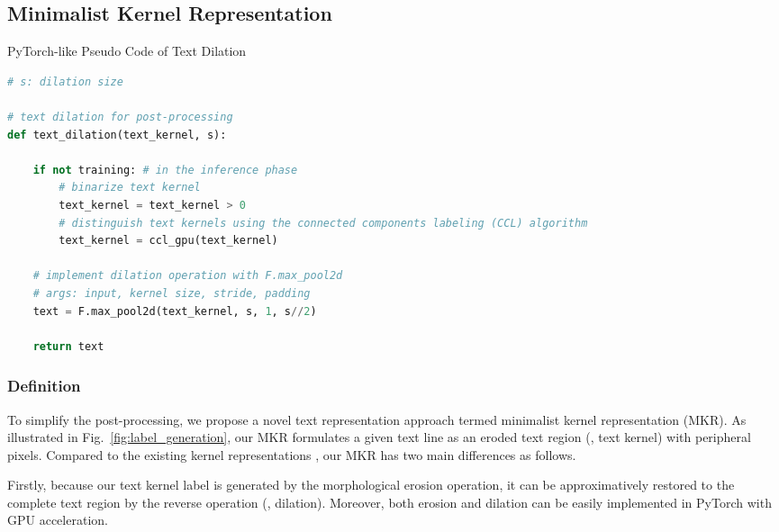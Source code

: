 \documentclass[lettersize,journal]{IEEEtran}
\begin{document}
\subsection{Minimalist Kernel Representation}



\begin{algorithm}[!t]

\caption{PyTorch-like Pseudo Code of Text Dilation}
\label{alg:pseudo_code}

\begin{lstlisting}[language=python]
# s: dilation size

# text dilation for post-processing
def text_dilation(text_kernel, s):

    if not training: # in the inference phase
        # binarize text kernel
        text_kernel = text_kernel > 0 
        # distinguish text kernels using the connected components labeling (CCL) algorithm
        text_kernel = ccl_gpu(text_kernel)
    
    # implement dilation operation with F.max_pool2d
    # args: input, kernel size, stride, padding
    text = F.max_pool2d(text_kernel, s, 1, s//2)    
    
    return text
\end{lstlisting}
\end{algorithm}



\subsubsection{Definition}
To simplify the post-processing, we propose a novel text representation approach termed minimalist kernel representation (MKR).
As illustrated in Fig.~\ref{fig:label_generation}, our MKR formulates a given text line as an eroded text region (\ie, text kernel) with peripheral pixels.
Compared to the existing kernel representations \cite{liao2020real,wang2019shape,wang2019efficient}, our MKR has two main differences as follows.

Firstly, because our text kernel label is generated by the morphological erosion operation, it can be approximatively restored to the complete text region by the reverse operation (\ie, dilation). 
Moreover, both erosion and dilation can be easily implemented in PyTorch with GPU acceleration.
\end{document}
